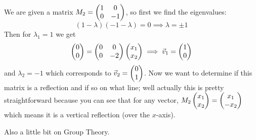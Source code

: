 \documentclass[english, 11pt]{article}
\begin{document}
      We are given a matrix $M_2 = \left(\begin{matrix}1 & 0 \\ 0 & -1\end{matrix}\right)$, so first we find the eigenvalues:
      \[ (1-\lambda)(-1 - \lambda) = 0 \implies \lambda = \pm 1 \]
      Then for $\lambda_1 = 1$ we get
      \[ \left(\begin{matrix}0\\0\end{matrix}\right) = \left(\begin{matrix}0 & 0 \\ 0 & -2\end{matrix}\right)\left(\begin{matrix}x_1 \\ x_2\end{matrix}\right) \implies {\vec{v}}_1 = \left(\begin{matrix}1 \\ 0\end{matrix}\right) \]
      and $\lambda_2 = -1$ which corresponds to ${\vec{v}}_2 = \left(\begin{matrix}0 \\ 1\end{matrix}\right)$. Now we want to determine if this matrix is a reflection and if so on what line; well actually this is pretty straightforward because you can see that for any vector, $M_2\left(\begin{matrix}x_1\\x_2\end{matrix}\right) = \left(\begin{matrix}x_1\\-x_2\end{matrix}\right)$ which means it is a vertical reflection (over the $x$-axis).
      \newline

      Also a little bit on Group Theory.

  
\end{document}
